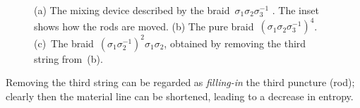 \documentclass[12pt]{article}
\begin{document}
\begin{figure}
\begin{center}
{  \label{fig:s1s2s-3_4_diagram}
}\hspace{2em}
\end{center}
\caption{(a) The mixing device described by the
  braid~$\sigma_1\sigma_2\sigma_3^{-1}$ \citep{Thiffeault2008b}.  The inset
  shows how the rods are moved.  (b) The pure
  braid~$(\sigma_1\sigma_2\sigma_3^{-1})^4$.  (c)~The
  braid~$(\sigma_1\sigma_2^{-1})^2\sigma_1\sigma_2$, obtained by removing the
  third string from~(b).}
\end{figure}
%
Removing the third string can be regarded as \emph{filling-in} the third
puncture (rod); clearly then the material line can be shortened, leading to a
decrease in entropy.
\end{document}
